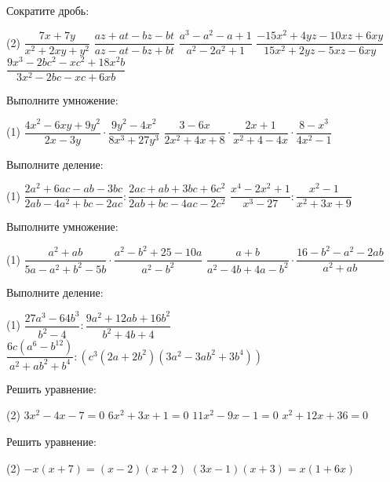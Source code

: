 %

\begin{class}[number=1]
	\begin{listofex}
		\item Сократите дробь:
		\begin{tasks}(2)
			\task \( \dfrac{7x+7y}{x^2+2xy+y^2} \)
			\task \( \dfrac{az+at-bz-bt}{az-at-bz+bt} \)
			\task \( \dfrac{a^3-a^2-a+1}{a^2-2a^2+1} \)
			\task \( \dfrac{-15x^2+4yz-10xz+6xy}{15x^2+2yz-5xz-6xy} \)
			\task \( \dfrac{9x^3-2bc^2-xc^2+18x^2b}{3x^2-2bc-xc+6xb} \)
		\end{tasks}
		\item Выполните умножение:
		\begin{tasks}(1)
			\task \( \dfrac{4x^2-6xy+9y^2}{2x-3y}\cdot\dfrac{9y^2-4x^2}{8x^3+27y^3} \)
			\task \( \dfrac{3-6x}{2x^2+4x+8}\cdot\dfrac{2x+1}{x^2+4-4x}\cdot\dfrac{8-x^3}{4x^2-1} \)
		\end{tasks}
		\item Выполните деление:
		\begin{tasks}(1)
				\task \( \dfrac{2a^2+6ac-ab-3bc}{2ab-4a^2+bc-2ac}:\dfrac{2ac+ab+3bc+6c^2}{2ab+bc-4ac-2c^2} \)
				\task \( \dfrac{x^4-2x^2+1}{x^3-27}:\dfrac{x^2-1}{x^2+3x+9} \)
		\end{tasks}
	\end{listofex}
\end{class}

\begin{homework}[number=1]
	\begin{listofex}
		\item Выполните умножение:
		\begin{tasks}(1)
			\task \( \dfrac{a^2+ab}{5a-a^2+b^2-5b}\cdot\dfrac{a^2-b^2+25-10a}{a^2-b^2} \)
			\task \( \dfrac{a+b}{a^2-4b+4a-b^2}\cdot\dfrac{16-b^2-a^2-2ab}{a^2+ab} \)
		\end{tasks}
		\item Выполните деление:
		\begin{tasks}(1)
			\task \( \dfrac{27a^3-64b^3}{b^2-4}:\dfrac{9a^2+12ab+16b^2}{b^2+4b+4} \)
			\task \( \dfrac{6c(a^6-b^{12})}{a^2+ab^2+b^4}:(c^3(2a+2b^2)(3a^2-3ab^2+3b^4)) \)
		\end{tasks}
		\item Решить уравнение:
		\begin{tasks}(2)
			\task \( 3x^2-4x-7=0 \)
			\task \( 6x^2+3x+1=0 \)
			\task \( 11x^2-9x-1=0 \)
			\task \( x^2+12x+36=0 \)
		\end{tasks}
		\item Решить уравнение:
		\begin{tasks}(2)
			\task \( -x(x+7)=(x-2)(x+2) \)
			\task \( (3x-1)(x+3)=x(1+6x) \)
		\end{tasks}
		\end{listofex}
\end{homework}

